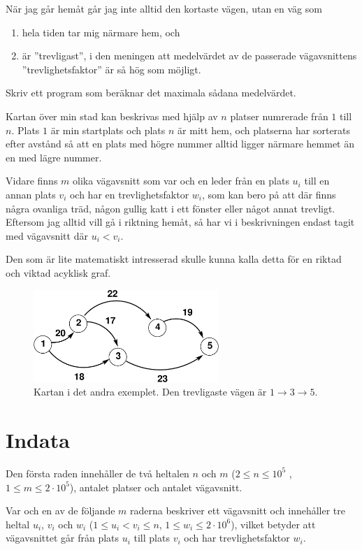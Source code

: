När jag går hemåt går jag inte alltid den kortaste vägen, utan en väg som
\begin{enumerate}
    \item hela tiden tar mig närmare hem, och
    \item är ''trevligast'', i den meningen att medelvärdet av de passerade vägavsnittens ''trevlighetsfaktor'' är så hög som möjligt.
\end{enumerate}
Skriv ett program som beräknar det maximala sådana medelvärdet.

Kartan över min stad kan beskrivas med hjälp av $n$ platser numrerade från $1$ till $n$. Plats $1$ är min startplats och plats $n$ är mitt hem, och platserna har sorterats efter avstånd så att en plats med högre nummer alltid ligger närmare hemmet än en med lägre nummer.

Vidare finns $m$ olika vägavsnitt som var och en leder från en plats $u_i$ till en annan plats $v_i$ och har en trevlighetsfaktor $w_i$, som kan bero på att där finns några ovanliga träd, någon gullig katt i ett fönster eller något annat trevligt. Eftersom jag alltid vill gå i riktning hemåt, så har vi i beskrivningen endast tagit med vägavsnitt där $u_i<v_i$.

Den som är lite matematiskt intresserad skulle kunna kalla detta för en riktad och viktad acyklisk graf.

\begin{figure}[h]
    \includegraphics[width=7cm]{trevlig.png}
    \caption{Kartan i det andra exemplet. Den trevligaste vägen är $1\rightarrow 3\rightarrow 5$.}
\end{figure}

\section*{Indata}
Den första raden innehåller de två heltalen $n$ och $m$ ($2 \leq n \leq 10^5$ , $1 \leq m \leq 2\cdot 10^5$), antalet platser och antalet vägavsnitt.

Var och en av de följande $m$ raderna beskriver ett vägavsnitt och innehåller tre heltal $u_i$, $v_i$ och $w_i$ ($1 \leq u_i < v_i \leq n$, $1 \le w_i \le 2\cdot 10^6$),
vilket betyder att vägavsnittet går från plats $u_i$ till plats $v_i$ och har trevlighetsfaktor $w_i$.


